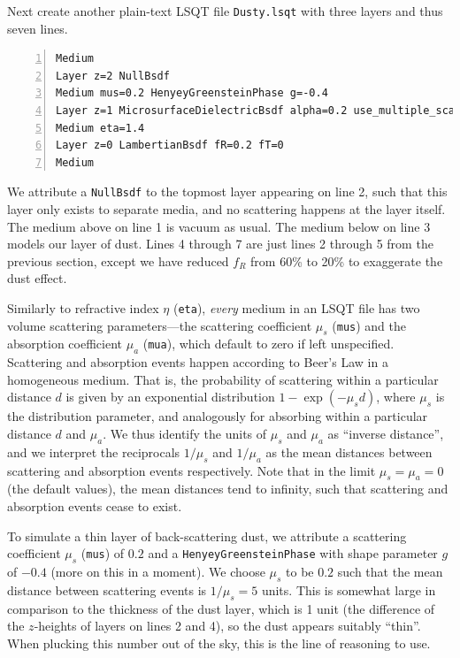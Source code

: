 \documentclass[
    twoside,
    twocolumn,
    letterpaper,
    10pt]{article}
\newcommand\namett[2]{{\color{code#1}\texttt{#2}}}
\begin{document}
Next create another plain-text LSQT file \texttt{Dusty.lsqt} with three 
layers and thus seven lines.
\begin{lstlisting}[numbers=left]
Medium
Layer z=2 NullBsdf
Medium mus=0.2 HenyeyGreensteinPhase g=-0.4
Layer z=1 MicrosurfaceDielectricBsdf alpha=0.2 use_multiple_scattering=false
Medium eta=1.4
Layer z=0 LambertianBsdf fR=0.2 fT=0
Medium
\end{lstlisting}
We attribute a \namett{purple}{NullBsdf} to the topmost layer appearing
on line 2, such that this layer only exists to separate media, and 
no scattering happens at the layer itself. The medium above on line 1 
is vacuum as usual. The medium below on line 3 models our layer of dust.
Lines 4 through 7 are just lines 2 through 5 from the previous
section, except we have reduced $f_R$ from 60\% to 20\% to exaggerate
the dust effect.

Similarly to refractive index $\eta$ (\texttt{eta}), \emph{every} 
medium in an LSQT file has two volume scattering parameters---the 
scattering coefficient $\mu_s$ (\texttt{mus}) and the absorption 
coefficient $\mu_a$ (\texttt{mua}), which default to zero if 
left unspecified. Scattering and absorption events happen according
to Beer's Law in a homogeneous medium. That is, the probability of 
scattering within a particular distance $d$ is given by an exponential 
distribution $1 - \exp{(-\mu_s d)}$, where $\mu_s$ is the distribution 
parameter, and analogously for absorbing within a particular distance 
$d$ and $\mu_a$. We thus identify the units of $\mu_s$ and $\mu_a$ as 
``inverse distance'', and we interpret the reciprocals $1/\mu_s$ and 
$1/\mu_a$ as the mean distances between scattering and absorption events
respectively. Note that in the limit $\mu_s = \mu_a = 0$ (the default values),
the mean distances tend to infinity, such that scattering and absorption events
cease to exist.

To simulate a thin layer of back-scattering dust, 
we attribute a scattering coefficient $\mu_s$ (\texttt{mus}) of $0.2$ and 
a \namett{purple}{HenyeyGreensteinPhase} with shape parameter $g$ of $-0.4$
(more on this in a moment). We choose $\mu_s$ to be $0.2$ such that the mean 
distance between scattering events is $1/\mu_s = 5$ units. This is somewhat 
large in comparison to the thickness of the dust layer, which is 1 unit 
(the difference of the $z$-heights of layers on lines 2 and 4), so the dust
appears suitably ``thin''. When plucking this number out of the sky, this is 
the line of reasoning to use. 
\end{document}

